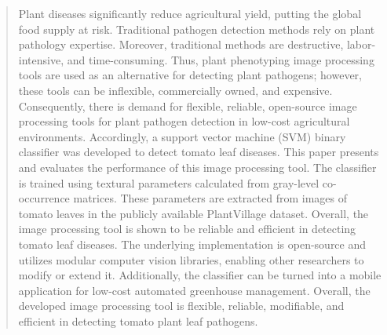 \begin{abstract}
Plant diseases significantly reduce agricultural yield, putting the global food supply at risk. Traditional pathogen detection methods rely on plant pathology expertise. Moreover, traditional methods are destructive, labor-intensive, and time-consuming. Thus, plant phenotyping image processing tools are used as an alternative for detecting plant pathogens; however, these tools can be inflexible, commercially owned, and expensive. Consequently, there is demand for flexible, reliable, open-source image processing tools for plant pathogen detection in low-cost agricultural environments. Accordingly, a support vector machine (SVM) binary classifier was developed to detect tomato leaf diseases. This paper presents and evaluates the performance of this image processing tool. The classifier is trained using textural parameters calculated from gray-level co-occurrence matrices. These parameters are extracted from images of tomato leaves in the publicly available PlantVillage dataset. Overall, the image processing tool is shown to be reliable and efficient in detecting tomato leaf diseases. The underlying implementation is open-source and utilizes modular computer vision libraries, enabling other researchers to modify or extend it. Additionally, the classifier can be turned into a mobile application for low-cost automated greenhouse management. Overall, the developed image processing tool is flexible, reliable, modifiable, and efficient in detecting tomato plant leaf pathogens.
\end{abstract}